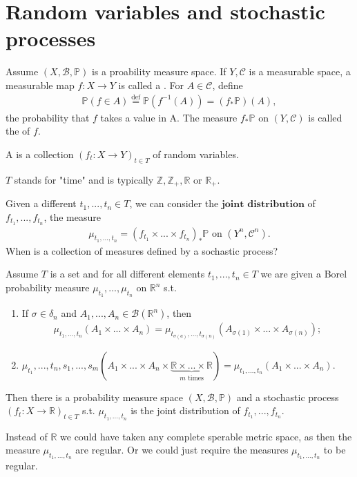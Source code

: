 \section{Random variables and stochastic processes}
Assume \((X,\mathscr{B}, \mathbb{P})\) is a proability measure space. If \(Y,\mathscr{C}\) is a measurable space, a measurable map \(f:X\rightarrow Y\) is called a . For \(A\in\mathscr{C}\), define 
\begin{align*}
    \mathbb{P}(f\in A) \overset{\text{def}}{=} \mathbb{P}(f^{-1}(A)) = (f_{*}\mathbb{P})(A), 
\end{align*}
the probability that \(f\) takes a value in A. The measure \(f_{*}\mathbb{P}\) on \((Y,\mathscr{C})\) is called the  of \(f\).
\begin{definition}
    A  is a collection \((f_t:X\rightarrow Y)_{t\in T}\) of random variables.
\end{definition}
\(T\) stands for "time" and is typically \(\mathbb{Z}, \mathbb{Z}_{+},\mathbb{R}\) or \(\mathbb{R}_{+}\). 

Given a different \(t_1,..., t_n\in T\), we can consider the \(\textbf{joint distribution}\) of \(f_{t_1}, ..., f_{t_n}\), the measure
\begin{align*}
    \mu_{t_1, ..., t_n} = (f_{t_1}\times ...\times f_{t_n})_{*}\mathbb{P} \text{ on } (Y^n,\mathscr{C}^n).
\end{align*}
When is a collection of measures defined by a sochastic process?
\begin{theorem}
    Assume \(T\) is a set and for all different elements \(t_1, ..., t_n\in T\) we are given a Borel probability measure \(\mu_{t_1}, ..., \mu_{t_n}\) on \(\mathbb{R}^n\) s.t. 
    \quad
    \begin{enumerate}[label=(\roman*)]
        \item If \(\sigma\in \delta_n\) and \(A_1, ..., A_n\in\mathscr{B}(\mathbb{R}^n)\), then 
        \begin{align*}
            \mu_{t_1, ..., t_n} (A_1\times ...\times A_n) = \mu_{t_{\sigma(a)}, ..., t_{\sigma(n)}}(A_{\sigma(1)}\times ...\times A_{\sigma(n)});
        \end{align*}
        \item \(\mu_{t_1}, ..., t_n, s_1, ..., s_m(A_1\times ...\times A_n\times\underbrace{\mathbb{R}\times ...\times\mathbb{R}}_{m\text{ times}}) = \mu_{t_1, ..., t_n}(A_1\times ...\times A_n)\).
    \end{enumerate}
    Then there is a probability measure space \((X,\mathscr{B},\mathbb{P})\) and a stochastic process \((f_t:X\rightarrow\mathbb{R})_{t\in T}\) s.t. \(\mu_{t_1, ..., t_n}\) is the joint distribution of \(f_{t_1}, ..., f_{t_n}\).
\end{theorem}
\begin{remark}
    Instead of \(\mathbb{R}\) we could have taken any complete sperable metric space, as then the measure \(\mu_{t_1, ..., t_n}\) are regular. Or we could just require the measures \(\mu_{t_1, ..., t_n}\) to be regular. 
\end{remark}

